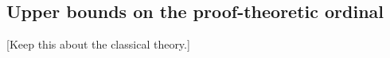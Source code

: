 \documentclass[UKenglish,cleveref,DIV=12]{scrartcl}
\theoremstyle{definition}
\theoremstyle{definition}
\begin{document}

\subsection{Upper bounds on the proof-theoretic ordinal}\label{extsec:Fbupper1}

[Keep this about the classical theory.]
\end{document}
